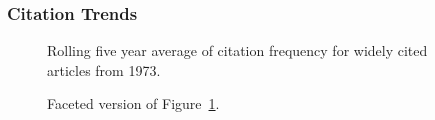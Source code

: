 \documentclass[
  10pt,
  letterpaper,
  DIV=11,
  numbers=noendperiod,
  twoside]{scrartcl}
\begin{document}
\subsubsection*{Citation Trends}\label{sec-trends-1973}

\begin{figure}


\caption{\label{fig-citation-spaghetti-1973}Rolling five year average of
citation frequency for widely cited articles from 1973.}

\end{figure}%

\begin{figure}


\caption{\label{fig-citation-facet-1973}Faceted version of
Figure~\ref{fig-citation-spaghetti-1973}.}

\end{figure}%
\end{document}
